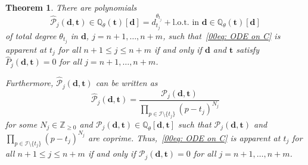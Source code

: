 \documentclass[pdftex]{sigma}
\numberwithin{equation}{section}
\newtheorem{Theorem}{Theorem}[section]
\def\Q{\mathbb Q}
\def\bt{\boldsymbol t}
\begin{document}
\begin{Theorem} \label{prop: apparent}
 There are polynomials
 \[
 \hat{\mathcal{P}}_j(\boldsymbol d,\boldsymbol t)\in\Q_\theta(\bt)[\boldsymbol d]=d_{t_{j}}^{\theta_{t_j}}+ \text{l.o.t.\ in $\boldsymbol d$} \in \Q_\theta(\boldsymbol t)[\boldsymbol d]
 \]
 of total degree $\theta_{t_j}$ in $\boldsymbol d$, $j=n+1,\dots,n+m$,
 such that~\eqref{00eq: ODE on C}
 is apparent at $t_j$ for all $n+1\leq j\leq n+m$ if
 and only if $\boldsymbol{d}$ and $\bt$ satisfy $\hat{P}_j(\boldsymbol{d},\bt)=0$ for all
 $j=n+1,\dots,n+m$.

 Furthermore,
 $\hat{\mathcal{P}}_j(\boldsymbol{d},\bt)$ can be written as
 \begin{equation}\label{e22q:PP}\hat{\mathcal{P}}_j(\boldsymbol{d},\bt)=\frac{\mathcal{P}_j(\boldsymbol{d},\bt)}
 {\prod_{p\in\mathcal{I}\setminus\{t_j\}}(p-t_j)^{N_j}}\end{equation}
 for some $N_j\in\mathbb{Z}_{\geq 0}$ and $\mathcal{P}_j(\boldsymbol{d},\bt)\in \Q_{\theta}[\boldsymbol{d},\bt]$ such that $\mathcal{P}_j(\boldsymbol{d},\bt)$ and $\prod_{p\in\mathcal{I}\setminus\{t_j\}}(p-t_j)^{N_j}$ are coprime. Thus,~\eqref{00eq: ODE on C}
 is apparent at $t_j$ for all $n+1\leq j\leq n+m$ if
 and only if $\mathcal{P}_j(\boldsymbol{d},\bt)=0$ for all
 $j=n+1,\dots,n+m$.
\end{Theorem}
\end{document}
